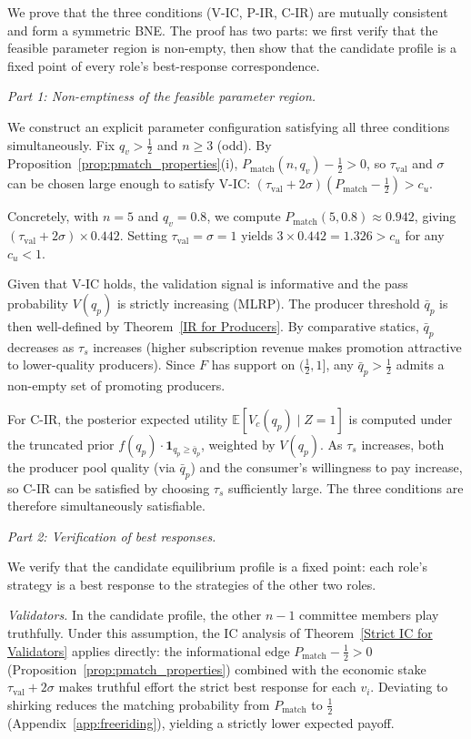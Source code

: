 We prove that the three conditions (V-IC, P-IR, C-IR) are mutually consistent and form a symmetric BNE. The proof has two parts: we first verify that the feasible parameter region is non-empty, then show that the candidate profile is a fixed point of every role's best-response correspondence.

\textit{Part 1: Non-emptiness of the feasible parameter region.}

We construct an explicit parameter configuration satisfying all three conditions simultaneously. Fix $q_v > \frac{1}{2}$ and $n \geq 3$ (odd). By Proposition~\ref{prop:pmatch_properties}(i), $P_{\text{match}}(n, q_v) - \frac{1}{2} > 0$, so $\tau_{\text{val}}$ and $\sigma$ can be chosen large enough to satisfy V-IC: $(\tau_{\text{val}} + 2\sigma)(P_{\text{match}} - \frac{1}{2}) > c_u$.

Concretely, with $n = 5$ and $q_v = 0.8$, we compute $P_{\text{match}}(5, 0.8) \approx 0.942$, giving $(\tau_{\text{val}} + 2\sigma) \times 0.442$. Setting $\tau_{\text{val}} = \sigma = 1$ yields $3 \times 0.442 = 1.326 > c_u$ for any $c_u < 1$.

Given that V-IC holds, the validation signal is informative and the pass probability $V(q_p)$ is strictly increasing (MLRP). The producer threshold $\bar{q}_p$ is then well-defined by Theorem~\ref{IR for Producers}. By comparative statics, $\bar{q}_p$ decreases as $\tau_s$ increases (higher subscription revenue makes promotion attractive to lower-quality producers). Since $F$ has support on $(\frac{1}{2}, 1]$, any $\bar{q}_p > \frac{1}{2}$ admits a non-empty set of promoting producers.

For C-IR, the posterior expected utility $\mathbb{E}[V_c(q_p) \mid Z = 1]$ is computed under the truncated prior $f(q_p) \cdot \mathbf{1}_{q_p \geq \bar{q}_p}$, weighted by $V(q_p)$. As $\tau_s$ increases, both the producer pool quality (via $\bar{q}_p$) and the consumer's willingness to pay increase, so C-IR can be satisfied by choosing $\tau_s$ sufficiently large. The three conditions are therefore simultaneously satisfiable.

\textit{Part 2: Verification of best responses.}

We verify that the candidate equilibrium profile is a fixed point: each role's strategy is a best response to the strategies of the other two roles.

\textit{Validators.} In the candidate profile, the other $n-1$ committee members play truthfully. Under this assumption, the IC analysis of Theorem~\ref{Strict IC for Validators} applies directly: the informational edge $P_{\text{match}} - \frac{1}{2} > 0$ (Proposition~\ref{prop:pmatch_properties}) combined with the economic stake $\tau_{\text{val}} + 2\sigma$ makes truthful effort the strict best response for each $v_i$. Deviating to shirking reduces the matching probability from $P_{\text{match}}$ to $\frac{1}{2}$ (Appendix~\ref{app:freeriding}), yielding a strictly lower expected payoff.

